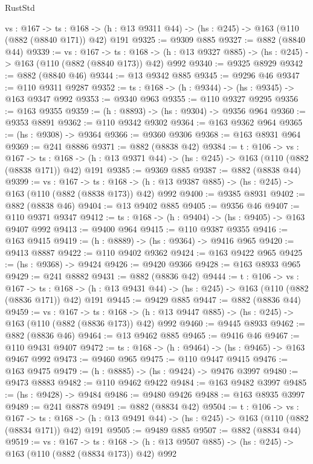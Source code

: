 \begin{lexlean}{RustStd}
\begin{coremodule}
  {vs : @167} ->
  {ts : @168} -> (h : @13 @9311 @44) -> (hs : @245) -> @163 (@110 (@882 (@8840 @171)) @42) @191
@9325 := @9309 @885
@9327 := @882 (@8840 @44)
@9339 := {vs : @167} ->
  {ts : @168} -> (h : @13 @9327 @885) -> (hs : @245) -> @163 (@110 (@882 (@8840 @173)) @42) @992
@9340 := @9325 @8929
@9342 := @882 (@8840 @46)
@9344 := @13 @9342 @885
@9345 := @9296 @46
@9347 := @110 @9311 @9287
@9352 := {ts : @168} -> (h : @9344) -> (hs : @9345) -> @163 @9347 @992
@9353 := @9340 @963
@9355 := @110 @9327 @9295
@9356 := @163 @9355
@9359 := (h : @8893) -> (hs : @9304) -> @9356 @964
@9360 := @9353 @8891
@9362 := @110 @9342 @9302
@9364 := @163 @9362 @964
@9365 := (hs : @9308) -> @9364
@9366 := @9360 @9306
@9368 := @163 @8931 @964
@9369 := @241 @8886
@9371 := @882 (@8838 @42)
@9384 := {t : @106} ->
  {vs : @167} ->
  {ts : @168} -> (h : @13 @9371 @44) -> (hs : @245) -> @163 (@110 (@882 (@8838 @171)) @42) @191
@9385 := @9369 @885
@9387 := @882 (@8838 @44)
@9399 := {vs : @167} ->
  {ts : @168} -> (h : @13 @9387 @885) -> (hs : @245) -> @163 (@110 (@882 (@8838 @173)) @42) @992
@9400 := @9385 @8931
@9402 := @882 (@8838 @46)
@9404 := @13 @9402 @885
@9405 := @9356 @46
@9407 := @110 @9371 @9347
@9412 := {ts : @168} -> (h : @9404) -> (hs : @9405) -> @163 @9407 @992
@9413 := @9400 @964
@9415 := @110 @9387 @9355
@9416 := @163 @9415
@9419 := (h : @8889) -> (hs : @9364) -> @9416 @965
@9420 := @9413 @8887
@9422 := @110 @9402 @9362
@9424 := @163 @9422 @965
@9425 := (hs : @9368) -> @9424
@9426 := @9420 @9366
@9428 := @163 @8933 @965
@9429 := @241 @8882
@9431 := @882 (@8836 @42)
@9444 := {t : @106} ->
  {vs : @167} ->
  {ts : @168} -> (h : @13 @9431 @44) -> (hs : @245) -> @163 (@110 (@882 (@8836 @171)) @42) @191
@9445 := @9429 @885
@9447 := @882 (@8836 @44)
@9459 := {vs : @167} ->
  {ts : @168} -> (h : @13 @9447 @885) -> (hs : @245) -> @163 (@110 (@882 (@8836 @173)) @42) @992
@9460 := @9445 @8933
@9462 := @882 (@8836 @46)
@9464 := @13 @9462 @885
@9465 := @9416 @46
@9467 := @110 @9431 @9407
@9472 := {ts : @168} -> (h : @9464) -> (hs : @9465) -> @163 @9467 @992
@9473 := @9460 @965
@9475 := @110 @9447 @9415
@9476 := @163 @9475
@9479 := (h : @8885) -> (hs : @9424) -> @9476 @3997
@9480 := @9473 @8883
@9482 := @110 @9462 @9422
@9484 := @163 @9482 @3997
@9485 := (hs : @9428) -> @9484
@9486 := @9480 @9426
@9488 := @163 @8935 @3997
@9489 := @241 @8878
@9491 := @882 (@8834 @42)
@9504 := {t : @106} ->
  {vs : @167} ->
  {ts : @168} -> (h : @13 @9491 @44) -> (hs : @245) -> @163 (@110 (@882 (@8834 @171)) @42) @191
@9505 := @9489 @885
@9507 := @882 (@8834 @44)
@9519 := {vs : @167} ->
  {ts : @168} -> (h : @13 @9507 @885) -> (hs : @245) -> @163 (@110 (@882 (@8834 @173)) @42) @992

\end{coremodule}
\end{lexlean}
